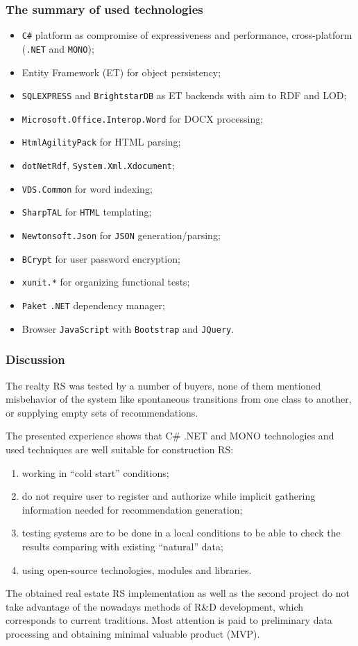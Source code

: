 \documentclass[10pt,dvipsnames]{beamer}
\begin{document}
\begin{frame}
  \frametitle{The summary of used technologies}

  \begin{itemize}
  \item \texttt{C\#} platform as compromise of expressiveness and performance, cross-platform (\texttt{.NET} and \texttt{MONO});
  \item Entity Framework (ET) for object persistency;
  \item \texttt{SQLEXPRESS} and \texttt{BrightstarDB} as ET backends with aim to RDF and LOD;
  \item \texttt{Microsoft.Office.Interop.Word} for DOCX processing;
  \item \texttt{HtmlAgilityPack} for HTML parsing;
  \item \texttt{dotNetRdf}, \texttt{System.Xml.Xdocument};
  \item \texttt{VDS.Common} for word indexing;
  \item \texttt{SharpTAL} for \texttt{HTML} templating;
  \item \texttt{Newtonsoft.Json} for \texttt{JSON} generation/parsing;
  \item \texttt{BCrypt} for user password encryption;
  \item \texttt{xunit.*} for organizing functional tests;
  \item \texttt{Paket} \texttt{.NET} dependency manager;
  \item Browser \texttt{JavaScript} with \texttt{Bootstrap} and \texttt{JQuery}.
  \end{itemize}
\end{frame}

\begin{frame}
  \frametitle{Discussion}
  The realty RS was tested by a number of buyers, none of them mentioned misbehavior of the system like spontaneous transitions from one class to another, or supplying empty sets of recommendations.

The presented experience shows that C\# .NET and MONO technologies and used techniques are well suitable for construction RS:
\begin{enumerate}
\item working in ``cold start'' conditions;
\item do not require user to register and authorize while implicit gathering information needed for recommendation generation;
\item testing systems are to be done in a local conditions to be able to check the results comparing with existing ``natural'' data;
\item using open-source technologies, modules and libraries.
\end{enumerate}

The obtained real estate RS implementation as well as the second project do not take advantage of the nowadays methods of R\&D development, which corresponds to current traditions.  Most attention is paid to preliminary data processing and obtaining minimal valuable product (MVP).
\end{frame}
\end{document}
